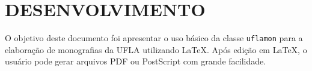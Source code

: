 \chapter{DESENVOLVIMENTO}
\label{cap:desenvolvimento}

O objetivo deste documento foi apresentar o uso básico da classe {\tt uflamon} para a elaboração de monografias da UFLA utilizando \LaTeX. Após edição em \LaTeX, o usuário pode gerar arquivos PDF \cite{PDF2004} ou PostScript \cite{PostScript1999} com grande facilidade.

